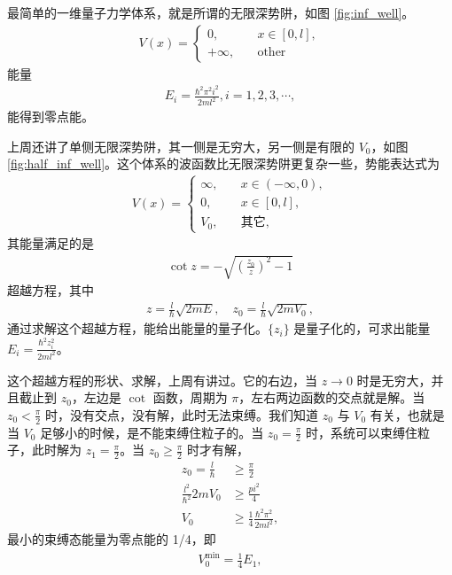 最简单的一维量子力学体系，就是所谓的无限深势阱，如图 \ref{fig:inf_well}。
\begin{align}
    V(x) = 
    \begin{cases}
        0, \quad &x\in[0,l],\\
        +\infty, \quad &\text{other}
    \end{cases}
\end{align}
能量 \begin{align}
    E_i = \frac{\hbar^2\pi^2 i^2} {2ml^2}, i = 1,2,3,\cdots,
\end{align}能得到零点能。

上周还讲了单侧无限深势阱，其一侧是无穷大，另一侧是有限的 $V_0$，如图 \ref{fig:half_inf_well}。这个体系的波函数比无限深势阱更复杂一些，势能表达式为
\begin{align}
    V(x) = 
    \begin{cases}
        \infty, \quad & x \in (-\infty, 0),\\
        0, \quad&x \in [0,l],\\
        V_0, \quad &\text{其它},
    \end{cases}
\end{align}
其能量满足的是
\begin{align}
    \cot z = -\sqrt{\left( \frac{z_0}z \right)^2 - 1}
\end{align}
超越方程，其中
\begin{align}
    z = \frac l\hbar \sqrt{2 m E}, \quad z_0 = \frac{l}{\hbar} \sqrt{2mV_0},
\end{align}
通过求解这个超越方程，能给出能量的量子化。$\{z_i\}$ 是量子化的，可求出能量 $E_i = \frac{\hbar^2 z_i^2}{2ml^2}$。

这个超越方程的形状、求解，上周有讲过。它的右边，当 $z \rightarrow0$ 时是无穷大，并且截止到 $z_0$，左边是 $\cot$ 函数，周期为 $\pi$，左右两边函数的交点就是解。当 $z_0 < \frac{\pi}2$ 时，没有交点，没有解，此时无法束缚。我们知道 $z_0$ 与 $V_0$ 有关，也就是当 $V_0$ 足够小的时候，是不能束缚住粒子的。当 $z_0 = \frac{\pi}2$ 时，系统可以束缚住粒子，此时解为 $z_1 = \frac{\pi}2$。当 $z_0 \geqslant \frac{\pi}2$ 时才有解，
\begin{align}
    z_0 = \frac{l}{\hbar} &\geqslant \frac{\pi}2 \\
    \frac{l^2}{\hbar^2} 2 m V_0 &\geqslant \frac{pi^2}4 \\
    V_0 &\geqslant \frac14 \frac{\hbar^2\pi^2}{2ml^2},
\end{align}
最小的束缚态能量为零点能的 1/4，即
\begin{align}
    V_0^{\text{min}} = \frac14 E_1,
\end{align}

